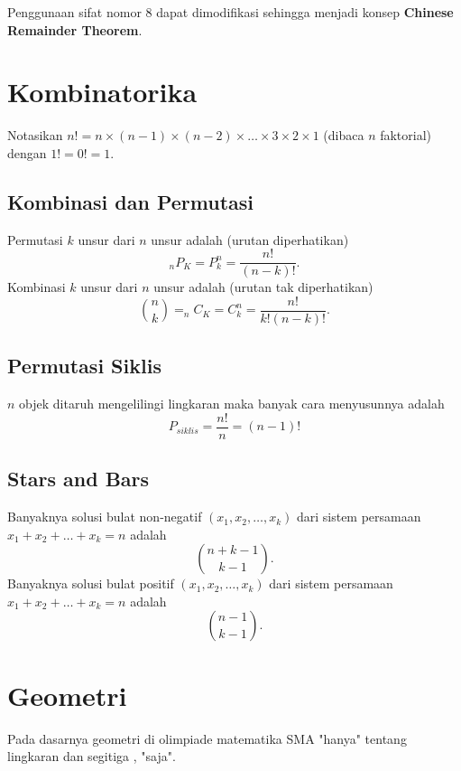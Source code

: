     Penggunaan sifat nomor 8 dapat dimodifikasi sehingga menjadi konsep \textbf{Chinese Remainder Theorem}.
    
    \section{Kombinatorika}
    
    Notasikan $n!=n \times (n-1) \times (n-2) \times \dots \times 3 \times 2 \times 1$ (dibaca $n$ faktorial) dengan $1!=0!=1$.
    
    \subsection{Kombinasi dan Permutasi}
    Permutasi $k$ unsur dari $n$ unsur adalah (urutan diperhatikan)
    $$_nP_K = P_k^n = \dfrac{n!}{(n-k)!}.$$
    Kombinasi $k$ unsur dari $n$ unsur adalah (urutan tak diperhatikan)
    $${n \choose k}=_nC_K = C_k^n = \dfrac{n!}{k!(n-k)!}.$$
    
    \subsection{Permutasi Siklis}
    $n$ objek ditaruh mengelilingi lingkaran maka banyak cara menyusunnya adalah
    $$P_{siklis} =\dfrac{n!}{n} = (n-1)!$$
    
    \subsection{Stars and Bars}
    Banyaknya solusi bulat non-negatif $(x_1,x_2,\dots,x_k)$ dari sistem persamaan $x_1+x_2+\dots+x_k=n$ adalah
    $${n+k-1 \choose k-1}.$$
    Banyaknya solusi bulat positif $(x_1,x_2,\dots,x_k)$ dari sistem persamaan $x_1+x_2+\dots+x_k=n$ adalah
    $${n-1 \choose k-1}.$$
    
    \section{Geometri}
    Pada dasarnya geometri di olimpiade matematika SMA "hanya" tentang lingkaran dan segitiga , "saja". 
    
